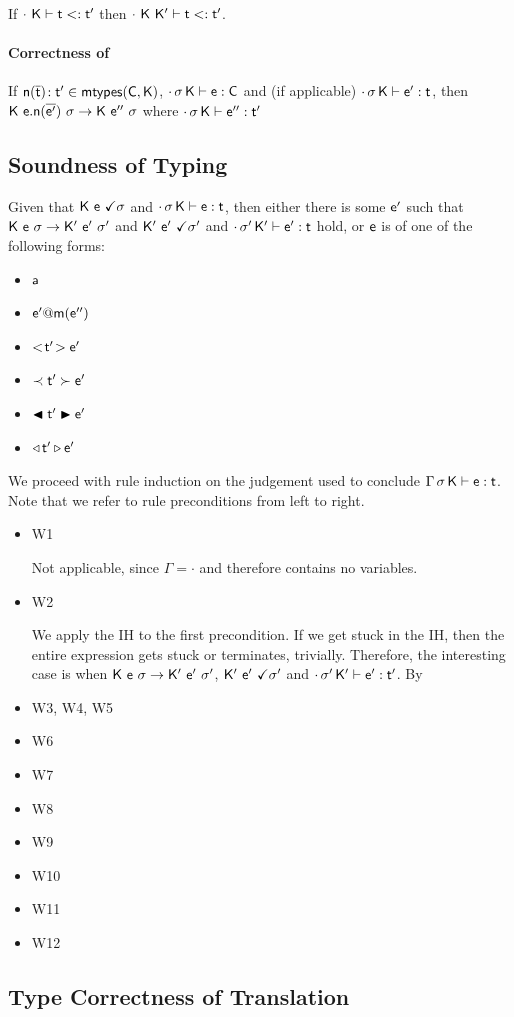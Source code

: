 \documentclass[a4paper,USenglish]{tex/lipics-v2016}
\begin{document}
If $\StrSub\cdot\K\t\tp$ then $\StrSub\cdot{\K~\Kp}\t\tp$.

\paragraph{Correctness of \classoff{\C}{\K}}

If $\Mtype\n{\b\t}\tp \in \classoff{\C}{\K}$, $\cdot\,\sigma\,{\sf{K}}\vdash {\sf{e}} : {\sf{C}}$ and (if applicable) $\EnvType\cdot\s\K\ep\t$, then ${{\sf{K}}}~{{\sf{e}}.{\sf{n}}(\overline{{{{\sf{e'}}}}})}~{\sigma} \rightarrow {\ensuremath{{\sf{K}}}}~{{{{\sf{e''}}}}}~{\sigma}$ where $\EnvType\cdot\s\K\epp\tp$

\subsection{Soundness of \kafka Typing}

Given that ${\sf{K}}~{\sf{e}}~\checkmark\sigma$ and $\EnvType\cdot\s\K\e\t$, then either there is some ${{{\sf{e'}}}}$ such that ${{\sf{K}}}~{{\sf{e}}}~{\sigma} \rightarrow {{\ensuremath{{\sf{K'}}}}}~{{{{\sf{e'}}}}}~{{{\sigma'}}}$ and ${{\sf{K'}}}~{{{\sf{e'}}}}~\checkmark{{\ensuremath{\sigma'}}}$ and $\EnvType\cdot\sp\Kp\ep\t$ hold, or ${\sf{e}}$ is of one of the following forms:
\begin{itemize} 
\item ${\sf{a}}$
\item $\DynCall\ep\m{\epp}$
\item $\SubCast\tp\ep$
\item $\ShaCast\tp\ep$
\item $\BehCast\tp\ep$
\item $\MonCast\tp\ep $
\end{itemize}
We proceed with rule induction on the judgement used to conclude $\EnvType\Env\s\K\e\t$. Note that we refer to rule preconditions from left to right.
\begin{itemize}
  \item W1

        Not applicable, since $\Gamma = \cdot$ and therefore contains no variables.
  \item W2

        We apply the IH to the first precondition. If we get stuck in the IH, then the entire expression gets stuck or terminates, trivially. Therefore, the interesting case is when ${{\sf{K}}}~{{\sf{e}}}~{\sigma} \rightarrow {{\ensuremath{{\sf{K'}}}}}~{{{{\sf{e'}}}}}~{{{\sigma'}}}$, ${{\sf{K'}}}~{{{\sf{e'}}}}~\checkmark{{\ensuremath{\sigma'}}}$ and $\EnvType\cdot\sp\Kp\ep\tp$. By 
  \item W3, W4, W5
  \item W6
  \item W7
  \item W8
  \item W9
  \item W10
  \item W11
  \item W12
\end{itemize}

\subsection{Type Correctness of Translation}
\end{document}
